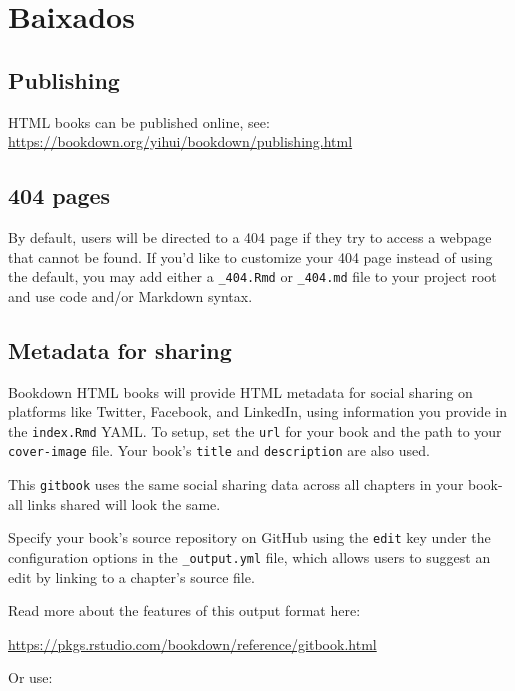 \documentclass[
]{book}
\begin{document}
\hypertarget{baixados}{%
\chapter{Baixados}\label{baixados}}

\hypertarget{publishing-3}{%
\section{Publishing}\label{publishing-3}}

HTML books can be published online, see: \url{https://bookdown.org/yihui/bookdown/publishing.html}

\hypertarget{pages-3}{%
\section{404 pages}\label{pages-3}}

By default, users will be directed to a 404 page if they try to access a webpage that cannot be found. If you'd like to customize your 404 page instead of using the default, you may add either a \texttt{\_404.Rmd} or \texttt{\_404.md} file to your project root and use code and/or Markdown syntax.

\hypertarget{metadata-for-sharing-3}{%
\section{Metadata for sharing}\label{metadata-for-sharing-3}}

Bookdown HTML books will provide HTML metadata for social sharing on platforms like Twitter, Facebook, and LinkedIn, using information you provide in the \texttt{index.Rmd} YAML. To setup, set the \texttt{url} for your book and the path to your \texttt{cover-image} file. Your book's \texttt{title} and \texttt{description} are also used.

This \texttt{gitbook} uses the same social sharing data across all chapters in your book- all links shared will look the same.

Specify your book's source repository on GitHub using the \texttt{edit} key under the configuration options in the \texttt{\_output.yml} file, which allows users to suggest an edit by linking to a chapter's source file.

Read more about the features of this output format here:

\url{https://pkgs.rstudio.com/bookdown/reference/gitbook.html}

Or use:
\end{document}
